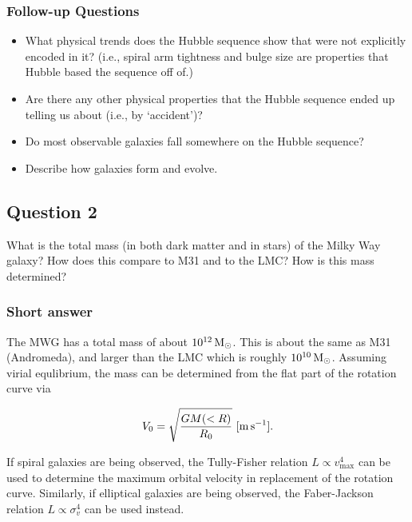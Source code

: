 \documentclass[a4paper,11pt]{article}
\begin{document}
\subsubsection{Follow-up Questions}

\begin{itemize}
    \item What physical trends does the Hubble sequence show that were not explicitly encoded in it? (i.e., spiral arm tightness and bulge size are properties that Hubble based the sequence off of.)
    \item Are there any other physical properties that the Hubble sequence ended up telling us about (i.e., by `accident')?
    \item Do most observable galaxies fall somewhere on the Hubble sequence?
    \item Describe how galaxies form and evolve.
\end{itemize}



\newpage
\subsection{Question 2}

What is the total mass (in both dark matter and in stars) of the Milky Way galaxy? How does this compare to M31 and to the LMC? How is this mass determined?

\subsubsection{Short answer}

The MWG has a total mass of about $10^{12}\,{\rm M_\odot}$. This is about the same as M31 (Andromeda), and larger than the LMC which is roughly $10^{10}\,{\rm M_\odot}$. Assuming virial equlibrium, the mass can be determined from the flat part of the rotation curve via

\begin{align*}
    V_0 = \sqrt{\frac{GM(<R)}{R_0}} ~ [{\rm m\,s^{-1}}].
\end{align*}

{\noindent}If spiral galaxies are being observed, the Tully-Fisher relation $L\propto v_\mathrm{max}^4$ can be used to determine the maximum orbital velocity in replacement of the rotation curve. Similarly, if elliptical galaxies are being observed, the Faber-Jackson relation $L\propto\sigma_v^4$ can be used instead.
\end{document}
